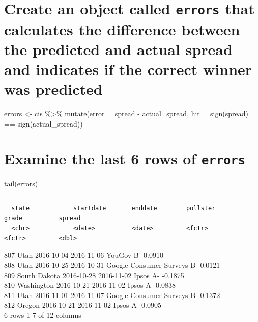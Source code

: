 \documentclass[
]{article}
\begin{document}
\begin{verbatim}
\end{verbatim}

\hypertarget{create-an-object-called-errors-that-calculates-the-difference-between-the-predicted-and-actual-spread-and-indicates-if-the-correct-winner-was-predicted}{%
\section{\texorpdfstring{Create an object called \texttt{errors} that
calculates the difference between the predicted and actual spread and
indicates if the correct winner was
predicted}{Create an object called errors that calculates the difference between the predicted and actual spread and indicates if the correct winner was predicted}}\label{create-an-object-called-errors-that-calculates-the-difference-between-the-predicted-and-actual-spread-and-indicates-if-the-correct-winner-was-predicted}}

errors \textless- cis \%\textgreater\% mutate(error = spread -
actual\_spread, hit = sign(spread) == sign(actual\_spread))

\hypertarget{examine-the-last-6-rows-of-errors}{%
\section{\texorpdfstring{Examine the last 6 rows of
\texttt{errors}}{Examine the last 6 rows of errors}}\label{examine-the-last-6-rows-of-errors}}

tail(errors)

\begin{verbatim}
\end{verbatim}

\begin{verbatim}
  state            startdate       enddate        pollster                 grade          spread
  <chr>            <date>          <date>         <fctr>                   <fctr>         <dbl>
\end{verbatim}

807 Utah 2016-10-04 2016-11-06 YouGov B -0.0910\\
808 Utah 2016-10-25 2016-10-31 Google Consumer Surveys B -0.0121\\
809 South Dakota 2016-10-28 2016-11-02 Ipsos A- -0.1875\\
810 Washington 2016-10-21 2016-11-02 Ipsos A- 0.0838\\
811 Utah 2016-11-01 2016-11-07 Google Consumer Surveys B -0.1372\\
812 Oregon 2016-10-21 2016-11-02 Ipsos A- 0.0905\\
6 rows \textbar{} 1-7 of 12 columns
\end{document}
